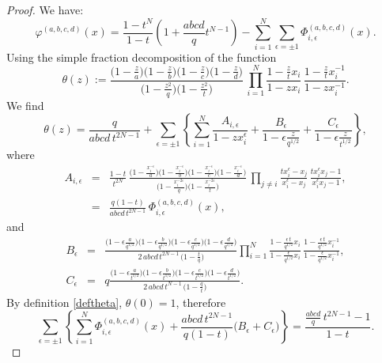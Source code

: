 \documentclass[12pt]{amsart}
\numberwithin{equation}{section}
\begin{document}
\begin{proof}
We have:
\begin{equation}\label{phiexp}
 \varphi^{(a,b,c,d)}(x)=\frac{1-t^N}{1-t}\left( 1+ \frac{abcd}{q}t^{N-1}\right)-\sum_{i=1}^N\sum_{\epsilon=\pm 1}
\Phi_{i,\epsilon}^{(a,b,c,d)}(x) .
\end{equation}
Using the simple fraction decomposition of the function
\begin{equation}\label{deftheta}
\theta(z):= 
\frac{\big(1-\frac{z}{a}\big)\big(1-\frac{z}{b}\big)\big(1-\frac{z}{c}\big)\big(1-\frac{z}{d}\big)}{\big(1-\frac{z^2}{q}\big)\big(1-\frac{z^2}{t}\big)} \, \prod_{i=1}^N\frac{1-\frac{z}{t} x_i}{1-z x_i}\, \frac{1-\frac{z}{t} x_i^{-1}}{1-z x_i^{-1}} .
\end{equation}
We find
$$\theta(z)=\frac{q}{abcd\,t^{2N-1}}+\sum_{\epsilon=\pm 1}\left\{ \sum_{i=1}^N \frac{A_{i,\epsilon}}{1-z x_i^{\epsilon}} +\frac{B_\epsilon}{1-\epsilon \frac{z}{q^{1/2}}}+\frac{C_\epsilon}{1-\epsilon \frac{z}{t^{1/2}}}\right\},$$
where
\begin{eqnarray*}
A_{i,\epsilon}&=&\frac{1-t}{t^{2N}}\,\frac{\big(1-\frac{x_i^{-\epsilon}}{a}\big)\big(1-\frac{x_i^{-\epsilon}}{b}\big)\big(1-\frac{x_i^{-\epsilon}}{c}\big)\big(1-\frac{x_i^{-\epsilon}}{d}\big)}{\big(1-\frac{x_i^{-2\epsilon}}{q}\big)\big(1-\frac{x_i^{-2\epsilon}}{t}\big)} \,
\prod_{j\neq i} \frac{t x_i^{\epsilon}-x_j}{x_i^{\epsilon}-x_j}\, \frac{t x_i^{\epsilon}x_j-1}{x_i^{\epsilon}x_j-1},\\
&=&
\frac{q(1-t)}{abcd\, t^{2N-1}}\, \Phi_{i,\epsilon}^{(a,b,c,d)}(x) ,
\end{eqnarray*}
and
\begin{eqnarray*}
B_\epsilon&=&\frac{\big(1-\epsilon\frac{a}{q^{1/2}}\big)\big(1-\epsilon\frac{b}{q^{1/2}}\big)\big(1-\epsilon\frac{c}{q^{1/2}}\big)\big(1-\epsilon\frac{d}{q^{1/2}}\big)}{2\,abcd\, t^{2N-1}\,\big(1-\frac{t}{q}\big)}\prod_{i=1}^N 
\frac{1-\frac{\epsilon\, t }{q^{1/2}}x_i}{1-\frac{\epsilon }{q^{1/2}}x_i}\,
\frac{1-\frac{\epsilon\, t }{q^{1/2}}x_i^{-1}}{1-\frac{\epsilon }{q^{1/2}}x_i^{-1}},\\
C_\epsilon&=&q\frac{\big(1-\epsilon\frac{a}{t^{1/2}}\big)\big(1-\epsilon\frac{b}{t^{1/2}}\big)\big(1-\epsilon\frac{c}{t^{1/2}}\big)\big(1-\epsilon\frac{d}{t^{1/2}}\big)}{2\,abcd\, t^{N-1}\,\big(1-\frac{q}{t}\big)}.
\end{eqnarray*}
By definition \eqref{deftheta}, $\theta(0)=1$, therefore
\begin{equation}\label{interm}
\sum_{\epsilon=\pm1}\left\{ \sum_{i=1}^N \Phi_{i,\epsilon}^{(a,b,c,d)}(x)+\frac{abcd\, t^{2N-1}}{q(1-t)}\big(B_\epsilon+C_{\epsilon}\big)\right\}=\frac{\frac{abcd}{q}\, t^{2N-1}-1}{1-t}.

\end{equation}
\end{proof}
\end{document}
